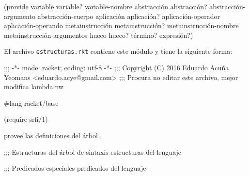\documentclass[letterpaper,twoside,openright,11pt]{book}
\begin{document}
\nwenddocs{}\endmoddef
(provide variable variable? variable-nombre
         abstracción abstracción? abstracción-argumento abstracción-cuerpo
         aplicación aplicación? aplicación-operador aplicación-operando
         metainstrucción metainstrucción? metainstrucción-nombre metainstrucción-argumentos
         hueco hueco?
         término? expresión?)
\nwendcode{}\nwdocspar

El archivo {\tt{}estructuras.rkt} contiene este módulo y tiene la siguiente forma:

\nwenddocs{}\endmoddef
;;; -*- mode: racket; coding: utf-8 -*-
;;; Copyright (C) 2016 Eduardo Acuña Yeomans <eduardo.acye@gmail.com>
;;; Procura no editar este archivo, mejor modifica lambda.nw

#lang racket/base

(require srfi/1)

\LA{}provee las definiciones del árbol~{\nwtagstyle{}}\RA{}

;;; Estructuras del árbol de sintaxis
\LA{}estructuras del lenguaje~{\nwtagstyle{}}\RA{}

;;; Predicados especiales
\LA{}predicados del lenguaje~{\nwtagstyle{}}\RA{}
\nwendcode{}\nwdocspar
\end{document}
